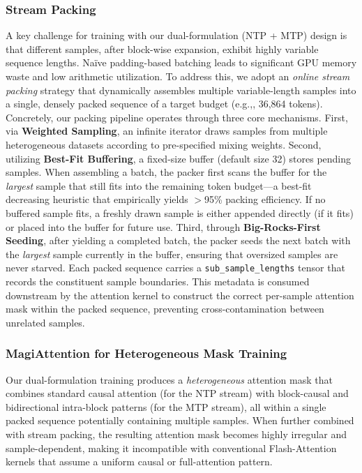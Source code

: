 \documentclass{llmxive}
\providecommand{\eg}{e.g.,\xspace}
\begin{document}
\subsubsection{Stream Packing}
A key challenge for training with our dual-formulation (NTP + MTP) design is that different samples, after block-wise expansion, exhibit highly variable sequence lengths. Na\"ive padding-based batching leads to significant GPU memory waste and low arithmetic utilization. To address this, we adopt an \textit{online stream packing} strategy that dynamically assembles multiple variable-length samples into a single, densely packed sequence of a target budget (\eg, 36,864 tokens). Concretely, our packing pipeline operates through three core mechanisms. First, via \textbf{Weighted Sampling}, an infinite iterator draws samples from multiple heterogeneous datasets according to pre-specified mixing weights. Second, utilizing \textbf{Best-Fit Buffering}, a fixed-size buffer (default size 32) stores pending samples. When assembling a batch, the packer first scans the buffer for the \textit{largest} sample that still fits into the remaining token budget---a best-fit decreasing heuristic that empirically yields $>$95\% packing efficiency. If no buffered sample fits, a freshly drawn sample is either appended directly (if it fits) or placed into the buffer for future use. Third, through \textbf{Big-Rocks-First Seeding}, after yielding a completed batch, the packer seeds the next batch with the \textit{largest} sample currently in the buffer, ensuring that oversized samples are never starved. Each packed sequence carries a \texttt{sub\_sample\_lengths} tensor that records the constituent sample boundaries. This metadata is consumed downstream by the attention kernel to construct the correct per-sample attention mask within the packed sequence, preventing cross-contamination between unrelated samples.



\subsubsection{MagiAttention for Heterogeneous Mask Training}
Our dual-formulation training produces a \textit{heterogeneous} attention mask that combines standard causal attention (for the NTP stream) with block-causal and bidirectional intra-block patterns (for the MTP stream), all within a single packed sequence potentially containing multiple samples. When further combined with stream packing, the resulting attention mask becomes highly irregular and sample-dependent, making it incompatible with conventional Flash-Attention kernels that assume a uniform causal or full-attention pattern.
\end{document}
